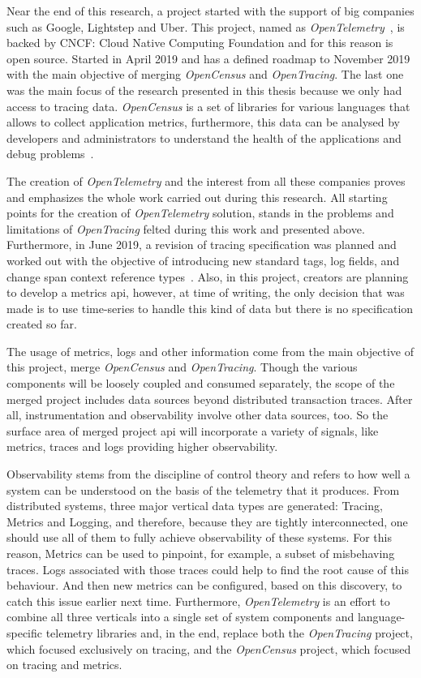 Near the end of this research, a project started with the support of big companies such as Google, Lightstep and Uber. This project, named as \emph{OpenTelemetry}~\cite{opentelemetry}, is backed by CNCF: Cloud Native Computing Foundation and for this reason is open source. Started in April 2019 and has a defined roadmap to November 2019 with the main objective of merging \emph{OpenCensus} and \emph{OpenTracing}. The last one was the main focus of the research presented in this thesis because we only had access to tracing data. \emph{OpenCensus} is a set of libraries for various languages that allows to collect application metrics, furthermore, this data can be analysed by developers and administrators to understand the health of the applications and debug problems~\cite{what_is_opencensus}.

The creation of \emph{OpenTelemetry} and the interest from all these companies proves and emphasizes the whole work carried out during this research. All starting points for the creation of \emph{OpenTelemetry} solution, stands in the problems and limitations of \emph{OpenTracing} felted during this work and presented above. Furthermore, in June 2019, a revision of tracing specification was planned and worked out with the objective of introducing new standard tags, log fields, and change span context reference types~\cite{opentelemetry_trace_specification}. Also, in this project, creators are planning to develop a metrics \gls{api}, however, at time of writing, the only decision that was made is to use time-series to handle this kind of data but there is no specification created so far.

The usage of metrics, logs and other information come from the main objective of this project, merge \emph{OpenCensus} and \emph{OpenTracing}. Though the various components will be loosely coupled and consumed separately, the scope of the merged project includes data sources beyond distributed transaction traces. After all, instrumentation and observability involve other data sources, too. So the surface area of merged project \gls{api} will incorporate a variety of signals, like metrics, traces and logs providing higher observability.

Observability stems from the discipline of control theory and refers to how well a system can be understood on the basis of the telemetry that it produces. From distributed systems, three major vertical data types are generated: Tracing, Metrics and Logging, and therefore, because they are tightly interconnected, one should use all of them to fully achieve observability of these systems. For this reason, Metrics can be used to pinpoint, for example, a subset of misbehaving traces. Logs associated with those traces could help to find the root cause of this behaviour. And then new metrics can be configured, based on this discovery, to catch this issue earlier next time. Furthermore, \emph{OpenTelemetry} is an effort to combine all three verticals into a single set of system components and language-specific telemetry libraries and, in the end, replace both the \emph{OpenTracing} project, which focused exclusively on tracing, and the \emph{OpenCensus} project, which focused on tracing and metrics.

\checkoddpage
{}
{
    \newpage
    \blankpage
}
{
}